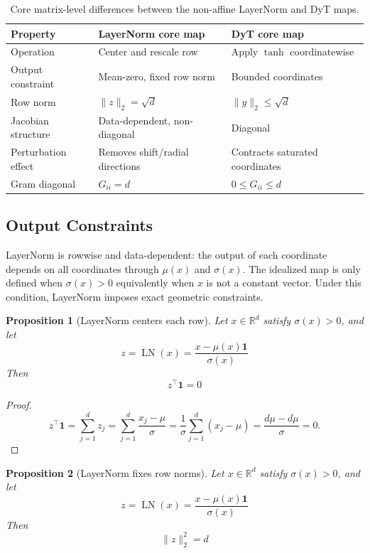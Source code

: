 \documentclass[11pt]{article}
\newtheorem{proposition}{Proposition}
\newcommand{\R}{\mathbb{R}}
\newcommand{\one}{\mathbf{1}}
\newcommand{\LN}{\operatorname{LN}}
\begin{document}
\begin{table}[h]
\centering
\begin{tabular}{lll}
\toprule
Property & LayerNorm core map & DyT core map \\
\midrule
Operation & Center and rescale row & Apply \(\tanh\) coordinatewise \\
Output constraint & Mean-zero, fixed row norm & Bounded coordinates \\
Row norm & \(\|z\|_2=\sqrt d\) & \(\|y\|_2\leq \sqrt d\) \\
Jacobian structure & Data-dependent, non-diagonal & Diagonal \\
Perturbation effect & Removes shift/radial directions & Contracts saturated coordinates \\
Gram diagonal & \(G_{ii}=d\) & \(0\leq G_{ii}\leq d\) \\
\end{tabular}
\caption{Core matrix-level differences between the non-affine LayerNorm and DyT maps.}
\label{tab:ln-dyt-map-summary}
\end{table}

\subsection{Output Constraints}

LayerNorm is rowwise and data-dependent: the output of each coordinate depends on all coordinates through \(\mu(x)\) and \(\sigma(x)\). The idealized map is only defined when
   $ \sigma(x)>0$
equivalently when \(x\) is not a constant vector. Under this condition, LayerNorm imposes exact geometric constraints.

\begin{proposition}[LayerNorm centers each row]
Let \(x\in\R^d\) satisfy \(\sigma(x)>0\), and let
\[
    z=\LN(x)=\frac{x-\mu(x)\one}{\sigma(x)}
\]
Then
\[
    z^\top \one=0
\]
\end{proposition}

\begin{proof}
\[
    z^\top\one
    =
    \sum_{j=1}^d z_j
    =
    \sum_{j=1}^d \frac{x_j-\mu}{\sigma}
    =
    \frac{1}{\sigma}\sum_{j=1}^d (x_j-\mu)
    =
    \frac{d\mu - d\mu}{\sigma}
    =0.
\]
\end{proof}

\begin{proposition}[LayerNorm fixes row norms]
Let \(x\in\R^d\) satisfy \(\sigma(x)>0\), and let
\[
    z=\LN(x)=\frac{x-\mu(x)\one}{\sigma(x)}
\]
Then
\[
    \|z\|_2^2=d
\]
\end{proposition}
\end{document}
